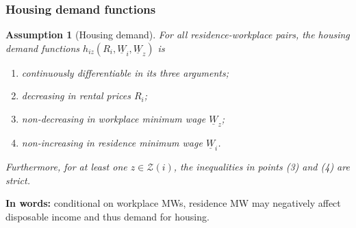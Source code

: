 \documentclass[aspectratio=169, t]{beamer}
\newtheorem{assu}{Assumption}
\newcommand{\Z}{\mathcal{Z}}
\newcommand{\MW}{\underline{W}}
\begin{document}
\begin{frame}
    \frametitle{Housing demand functions}
   
    \begin{assu}[Housing demand]\label{assu:housing_function}
        For all residence-workplace pairs, the housing demand functions $h_{iz} (R_i, \MW_i, \MW_z)$ is
        \begin{enumerate}
            \item continuously differentiable in its three arguments;
            \item decreasing in rental prices $R_i$;
            \item non-decreasing in workplace minimum wage $\MW_z$;
            \item non-increasing in residence minimum wage $\MW_i$.
        \end{enumerate}
        Furthermore, for at least one $z\in\Z(i)$, the inequalities in points (3)
        and (4) are strict.
    \end{assu}

    \pause 
    \vspace{2mm}

    \textbf{In words:} conditional on workplace MWs, residence MW may negatively affect disposable income
    and thus demand for housing.
\end{frame}
\end{document}
